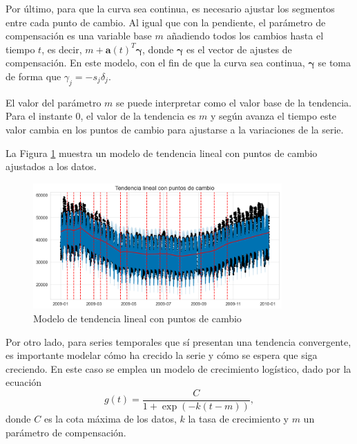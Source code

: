 \documentclass[12pt,twoside]{article}
\begin{document}
Por último, para que la curva sea continua, es necesario ajustar los segmentos entre cada punto de cambio. Al igual que con la pendiente, el parámetro de compensación es una variable base $m$ añadiendo todos los cambios hasta el tiempo $t$, es decir, $m + \mathbf{a}(t)^T\boldsymbol{\gamma}$, donde $\boldsymbol{\gamma}$ es el vector de ajustes de compensación. En este modelo, con el fin de que la curva sea continua, $\boldsymbol{\gamma}$ se toma de forma que $\gamma_j = - s_j\delta_j$. 

El valor del parámetro $m$ se puede interpretar como el valor base de la tendencia. Para el instante $0$, el valor de la tendencia es $m$ y según avanza el tiempo este valor cambia en los puntos de cambio para ajustarse a la variaciones de la serie.

La Figura \ref{fig:changepoints} muestra un modelo de tendencia lineal con puntos de cambio ajustados a los datos.
\begin{figure}[h]
\centering
    \includegraphics[width =0.85\textwidth]{imagenes/changepoints.png}
    \caption{Modelo de tendencia lineal con puntos de cambio}\label{fig:changepoints}
\end{figure}

Por otro lado, para series temporales que sí presentan una tendencia convergente, es importante modelar cómo ha crecido la serie y cómo se espera que siga creciendo. En este caso se emplea un modelo de crecimiento logístico, dado por la ecuación
\begin{equation}\label{eq:prophet:g_log}
    g(t) = \frac{C}{1 + \exp{(-k(t-m))}},
\end{equation}
donde $C$ es la cota máxima de los datos, $k$ la tasa de crecimiento y $m$ un parámetro de compensación. 
\end{document}
